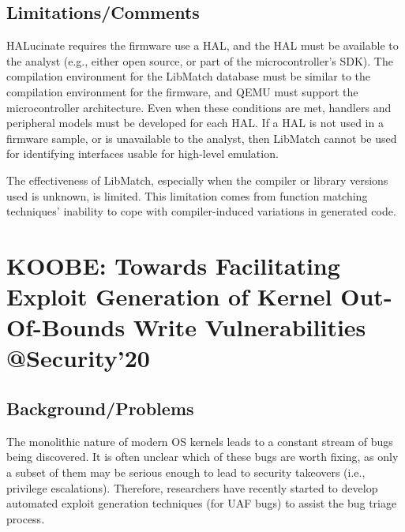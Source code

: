 \subsection{Limitations/Comments}
HALucinate requires the firmware use a HAL, and the HAL must be available to the analyst (e.g., either open source, or part of the microcontroller’s SDK). The compilation environment for the LibMatch database must be similar to the compilation environment for the firmware, and QEMU must support the microcontroller architecture.  Even when these conditions are met, handlers and peripheral models must be developed for each HAL.  If a HAL is not used in a firmware sample, or is unavailable to the analyst, then LibMatch cannot be used for identifying interfaces usable for high-level emulation. 

The effectiveness of LibMatch, especially when the compiler or library versions used is unknown, is limited. This limitation comes from function matching techniques’ inability to cope with compiler-induced variations in generated code. 
\newpage
\section{KOOBE: Towards Facilitating Exploit Generation of Kernel Out-Of-Bounds Write Vulnerabilities \\@Security'20}
\subsection{Background/Problems}
The monolithic nature of modern OS kernels leads to a constant stream of bugs being discovered. It is often unclear which of these bugs are worth fixing, as only a subset of them may be serious enough to lead to security takeovers (i.e., privilege escalations). Therefore, researchers have recently started to develop automated exploit generation techniques (for UAF bugs) to assist the bug triage process. 
